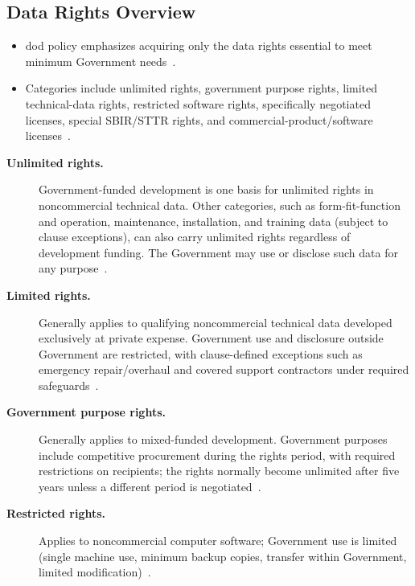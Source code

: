\documentclass[../main.tex]{subfiles}
\begin{document}
\subsection{Data Rights Overview}
\begin{itemize}
  \item \ac{dod} policy emphasizes acquiring only the data rights essential to meet minimum Government needs~\autocite{edo-3-2-2-solicitation-prep-2025}.
  \item Categories include unlimited rights, government purpose rights, limited technical-data rights, restricted software rights, specifically negotiated licenses, special SBIR/STTR rights, and commercial-product/software licenses~\autocite{edo-3-2-2-solicitation-prep-2025}.
\end{itemize}
\begin{description}
  \item[\textbf{Unlimited rights.}] Government-funded development is one basis for unlimited rights in noncommercial technical data. Other categories, such as form-fit-function and operation, maintenance, installation, and training data (subject to clause exceptions), can also carry unlimited rights regardless of development funding. The Government may use or disclose such data for any purpose~\autocite{edo-3-2-2-solicitation-prep-2025,DFARS-252-227-7013-2026}.
  \item[\textbf{Limited rights.}] Generally applies to qualifying noncommercial technical data developed exclusively at private expense. Government use and disclosure outside Government are restricted, with clause-defined exceptions such as emergency repair/overhaul and covered support contractors under required safeguards~\autocite{edo-3-2-2-solicitation-prep-2025,DFARS-252-227-7013-2026}.
  \item[\textbf{Government purpose rights.}] Generally applies to mixed-funded development. Government purposes include competitive procurement during the rights period, with required restrictions on recipients; the rights normally become unlimited after five years unless a different period is negotiated~\autocite{edo-3-2-2-solicitation-prep-2025,DFARS-252-227-7013-2026}.
  \item[\textbf{Restricted rights.}] Applies to noncommercial computer software; Government use is limited (single machine use, minimum backup copies, transfer within Government, limited modification)~\autocite{edo-3-2-2-solicitation-prep-2025}.
\end{description}
\end{document}
